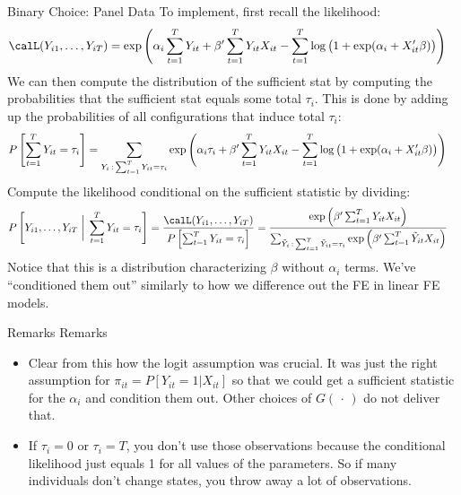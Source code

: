 \documentclass[handout]{beamer}
\newcommand{\sumtT}{\sum^T_{t=1}}
\begin{document}
\begin{frame}[shrink]{Binary Choice: Panel Data}
To implement, first recall the likelihood:
\begin{align*}
  &\calL(Y_{i1},\ldots,Y_{iT})
  =
  \exp\left(
  \alpha_i
  \sumtT
  Y_{it}
  +
  \beta'
  \sumtT
  Y_{it} X_{it}
  -
  \sumtT
  \log\big(1+\exp(\alpha_i+X_{it}'\beta)\big)
  \right)
\end{align*}
We can then compute the distribution of the sufficient stat by computing
the probabilities that the sufficient stat equals some total $\tau_i$.
This is done by adding up the probabilities of all configurations that
induce total $\tau_i$:
\begin{align*}
  &
  P\left[
  \sumtT
  Y_{it}
  =
  \tau_i
  \right]
  =
  \sum_{%
    {Y}_i\,:\,\sum_{t=1}^TY_{it}=\tau_i
  }
  \exp\left(
  \alpha_i
  \tau_i
  +
  \beta'
  \sumtT
  {Y}_{it} X_{it}
  -
  \sumtT
  \log\big(1+\exp(\alpha_i+X_{it}'\beta)\big)
  \right)
\end{align*}
Compute the likelihood conditional on the sufficient statistic by
dividing:
\begin{align*}
  P\left[
  Y_{i1},\ldots,Y_{iT}
  \;\bigg|\;
  \sumtT
  Y_{it}
  =
  \tau_i
  \right]
  &=
  \frac{%
    \calL(Y_{i1},\ldots,Y_{iT})
  }{%
    P\left[
    \sumtT
    Y_{it}
    =
    \tau_i
    \right]
  }
  =
  \frac{%
    \exp\left(
    \beta'
    \sumtT
    Y_{it} X_{it}
    \right)
  }{%
    \sum_{%
      \tilde{Y}_i\,:\,\sum_{t=1}^T\tilde{Y}_{it}=\tau_i
    }
    \exp\left(
    \beta'
    \sumtT
    \tilde{Y}_{it} X_{it}
    \right)
  }
\end{align*}
Notice that this is a distribution characterizing $\beta$ without
$\alpha_i$ terms.
We've ``conditioned them out'' similarly to how we difference out the FE
in linear FE models.
\end{frame}


\begin{frame}[shrink]{Remarks}
Remarks
\begin{itemize}
  \item Clear from this how the logit assumption was crucial.
    It was just the right assumption for $\pi_{it}=P[Y_{it}=1|X_{it}]$
    so that we could get a sufficient statistic for the $\alpha_i$ and
    condition them out.
    Other choices of $G(\,\cdot\,)$ do not deliver that.
  \item
    If $\tau_i=0$ or $\tau_i=T$, you don't use those observations
    because the conditional likelihood just equals 1 for all values of
    the parameters.
    So if many individuals don't change states, you throw away a lot of
    observations.
\end{itemize}
\end{frame}
\end{document}
